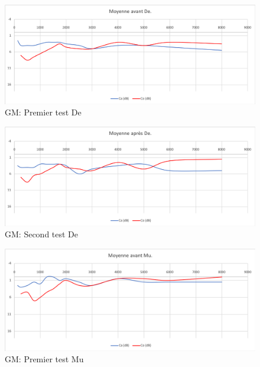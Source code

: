 
 
 
 
 
 \begin{figure}[th]
 	\centering
 	\includegraphics[width=1\linewidth]{images/graphiques/moyavDE.png}
 	\caption[Patient De : 1° test]{GM: Premier test De}
 	\label{fig:moyavde}
 \end{figure}
 
 
 \begin{figure}[th]
 	\centering
 	\includegraphics[width=1\linewidth]{images/graphiques/moyaprDE}
 	\caption[Patient De : 2° test]{GM: Second test De}
 	\label{fig:moyaprde}
 \end{figure}
 
 
 
 
 \begin{figure}[th]
 	\centering
 	\includegraphics[width=1\linewidth]{images/graphiques/moyavMU.png}
 	\caption[Patient Mu : 1° test]{GM: Premier test Mu}
 	\label{fig:moyavmu}
 \end{figure}
 
